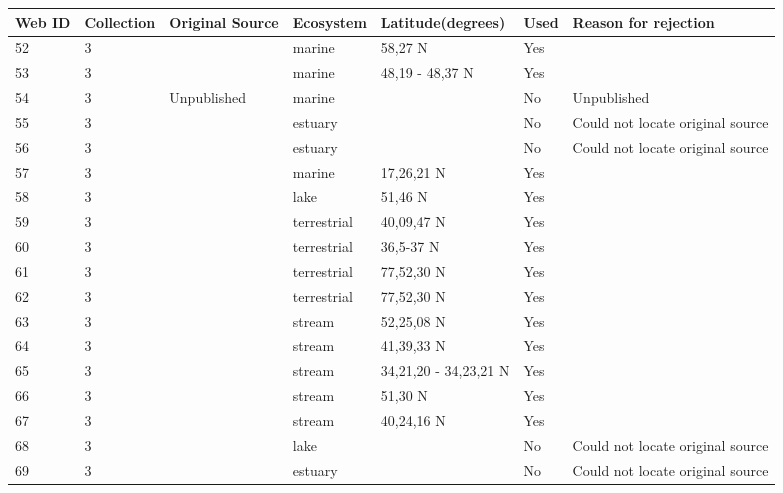 \documentclass[12pt]{article}
\begin{document}
\begin{landscape}
    \begin{table}[h!]
    \centering
    {\footnotesize
      \begin{tabular}{p{2.8cm}p{1.3cm}p{3cm}p{2.2cm}p{2.5cm}lp{8.2cm}}
        \hline
        Web ID & Collection & Original Source & Ecosystem & Latitude(degrees) & Used  & Reason for rejection  \\
        \hline
        52    & 3 & \cite{Paine1980a}    & marine & 58,27 N & Yes   &       \\
        53    & 3 & \cite{Paine1980a}    & marine & 48,19 - 48,37 N & Yes   &       \\
        54    & 3 & Unpublished  & marine &       & No    & Unpublished \\
        55    & 3 & \cite{Milne1972}  & estuary &       & No    & Could not locate original source \\
        56    & 3 & \cite{Milne1972}  & estuary &       & No    & Could not locate original source \\
        57    & 3 & \cite{Yanez1978}  & marine & 17,26,21 N & Yes   &       \\
        58    & 3 & \cite{Smirnov1961}  & lake & 51,46 N & Yes   &       \\
        59    & 3 & \cite{Twomey1945}    & terrestrial & 40,09,47 N & Yes   &       \\
        60    & 3 & \cite{Rasmussen1941}    & terrestrial & 36,5-37 N & Yes  &       \\
        61    & 3 & \cite{Summerhayes1928}  & terrestrial & 77,52,30 N & Yes   &       \\
        62    & 3 & \cite{Summerhayes1928}  & terrestrial & 77,52,30 N & Yes   &       \\
        63    & 3 & \cite{Jones1950}     & stream & 52,25,08 N & Yes   &       \\
        64    & 3 & \cite{Cummins1966}    & stream & 41,39,33 N & Yes   &       \\
        65    & 3 & \cite{Tsuda1972}  & stream & 34,21,20 - 34,23,21 N & Yes   &       \\
        66    & 3 & \cite{Mann1972a}  & stream & 51,30 N & Yes   &       \\
        67    & 3 & \cite{Carlson1968}    & stream & 40,24,16 N & Yes   &       \\
        68    & 3 & \cite{Morgan1972}  & lake &       & No    & Could not locate original source \\
        69    & 3 & \cite{Cohen1990}  & estuary &       & No    & Could not locate original source \\

\end{tabular}}
\end{table}
\end{landscape}
\end{document}
